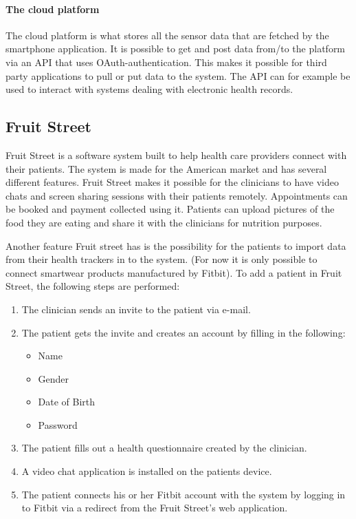 \documentclass{cslthse-msc}
\begin{document}
\paragraph{The cloud platform} The cloud platform is what stores all the sensor data that are fetched by the smartphone application. It is possible to get and post data from/to the platform via an API that uses OAuth-authentication. This makes it possible for third party applications to pull or put data to the system. The API can for example be used to interact with systems dealing with electronic health records\cite{tactio2014}\cite{TactioWebsite}.


\subsection{Fruit Street}

Fruit Street is a software system built to help health care providers connect with their patients. The system is made for the American market and has several different features. Fruit Street makes it possible for the clinicians to have video chats and screen sharing sessions with their patients remotely. Appointments can be booked and payment collected using it. Patients can upload pictures of the food they are eating and share it with the clinicians for nutrition purposes. 

Another feature Fruit street has is the possibility for the patients to import data from their health trackers\cite{FruitStreet} in to the system. (For now it is only possible to connect smartwear products manufactured by Fitbit). To add a patient in Fruit Street, the following steps are performed:

\begin{enumerate}
    \item The clinician sends an invite to the patient via e-mail.
    \item The patient gets the invite and creates an account by filling in the following:
\begin{itemize}
    \item Name
    \item Gender
    \item Date of Birth
    \item Password
\end{itemize}
    \item The patient fills out a health questionnaire created by the clinician.
    \item A video chat application is installed on the patients device.
    \item The patient connects his or her Fitbit account with the system by logging in to Fitbit via a redirect from the Fruit Street's web application.
\end{enumerate}
\end{document}
